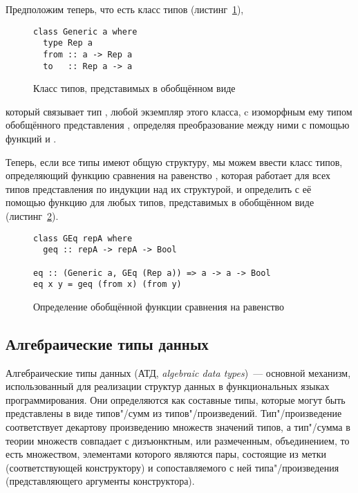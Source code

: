 Предположим теперь, что есть класс типов (листинг~\ref{list:generic}),
\begin{figure}[h]
\begin{framed}
\vspace{-0.25cm}
\begin{lstlisting}
class Generic a where
  type Rep a
  from :: a -> Rep a
  to   :: Rep a -> a
\end{lstlisting}
\vspace{-0.25cm}
\end{framed}
\caption{Класс типов, представимых в обобщённом виде}
\label{list:generic}
\end{figure}
который связывает тип , любой экземпляр этого класса, c
изоморфным ему типом обобщённого представления ,
определяя преобразование между ними с помощью функций
 и .

Теперь, если все типы  имеют общую структуру, мы
можем ввести класс типов, определяющий функцию сравнения на
равенство , которая работает для всех типов
представления по индукции над их структурой, и определить с её
помощью функцию  для любых типов, представимых в
обобщённом виде (листинг~\ref{list:geq}).

\begin{figure}[h]
\begin{framed}
\vspace{-0.25cm}
\begin{lstlisting}
class GEq repA where
  geq :: repA -> repA -> Bool

eq :: (Generic a, GEq (Rep a)) => a -> a -> Bool
eq x y = geq (from x) (from y)
\end{lstlisting}
\vspace{-0.25cm}
\end{framed}
\caption{Определение обобщённой функции сравнения на равенство}
\label{list:geq}
\end{figure}

\subsection{Алгебраические типы данных}

Алгебраические типы данных
(АТД, \textsl{algebraic data types})~--- основной механизм,
использованный для реализации структур данных в функциональных
языках программирования. Они определяются как составные типы,
которые могут быть представлены в виде типов"/сумм из
типов"/произведений. Тип"/произведение соответствует декартову
произведению множеств значений типов, а тип"/сумма в теории
множеств совпадает с дизъюнктным, или размеченным,
объединением, то есть множеством, элементами которого являются
пары, состоящие из метки (соответствующей конструктору) и
сопоставляемого с ней типа"/произведения (представляющего
аргументы конструктора).

